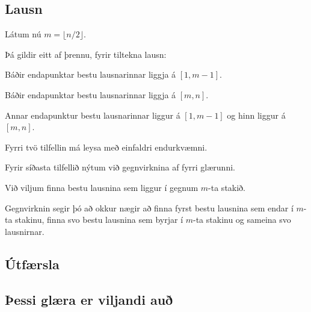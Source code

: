 \subsection{Lausn}
{
    {
        \item<1-> Látum nú $m = \lfloor n/2 \rfloor$.
        \item<2-> Þá gildir eitt af þrennu, fyrir tiltekna lausn:
        {
            \item<3-> Báðir endapunktar bestu lausnarinnar liggja á $[1, m - 1]$.
            \item<4-> Báðir endapunktar bestu lausnarinnar liggja á $[m, n]$.
            \item<5-> Annar endapunktur bestu lausnarinnar liggur á $[1, m - 1]$ og hinn liggur á $[m, n]$.
        }
        \item<6-> Fyrri tvö tilfellin má leysa með einfaldri endurkvæmni.
        \item<7-> Fyrir síðasta tilfellið nýtum við gegnvirknina af fyrri glærunni.
        \item<8-> Við viljum finna bestu lausnina sem liggur í gegnum $m$-ta stakið.
        \item<9-> Gegnvirknin segir þó að okkur nægir að finna fyrst bestu lausnina sem endar í $m$-ta stakinu,
                    finna svo bestu lausnina sem byrjar í $m$-ta stakinu og
                    sameina svo lausnirnar.
    }
}

\subsection{Útfærsla}
{
}

\subsection{Þessi glæra er viljandi auð}
{
}


